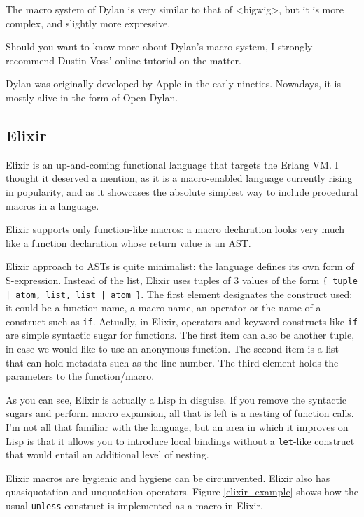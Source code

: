 The macro system of Dylan is very similar to that of <bigwig>, but it is more
complex, and slightly more expressive.

Should you want to know more about Dylan's macro system, I strongly recommend
Dustin Voss' online tutorial on the matter. \cite{dylan_macros}

Dylan was originally developed by Apple in the early nineties. Nowadays, it is
mostly alive in the form of Open Dylan. \cite{open_dylan}

\subsection{Elixir}

Elixir is an up-and-coming functional language that targets the Erlang VM.  I
thought it deserved a mention, as it is a macro-enabled language currently
rising in popularity, and as it showcases the absolute simplest way to include
procedural macros in a language.

Elixir supports only function-like macros: a macro declaration looks very much
like a function declaration whose return value is an AST.

Elixir approach to ASTs is quite minimalist: the language defines its own form
of S-expression. Instead of the list, Elixir uses tuples of 3 values of the form
\texttt{\{ tuple | atom, list, list | atom \}}. The first element designates the
construct used: it could be a function name, a macro name, an operator or the
name of a construct such as \texttt{if}. Actually, in Elixir, operators and
keyword constructs like \texttt{if} are simple syntactic sugar for
functions. The first item can also be another tuple, in case we would like to
use an anonymous function. The second item is a list that can hold metadata such
as the line number. The third element holds the parameters to the
function/macro.

As you can see, Elixir is actually a Lisp in disguise. If you remove the
syntactic sugars and perform macro expansion, all that is left is a nesting of
function calls. I'm not all that familiar with the language, but an area in
which it improves on Lisp is that it allows you to introduce local bindings
without a \texttt{let}-like construct that would entail an additional level of
nesting.

Elixir macros are hygienic and hygiene can be circumvented. Elixir also has
quasiquotation and unquotation operators. Figure \ref{elixir_example} shows how
the usual \texttt{unless} construct is implemented as a macro in Elixir.

